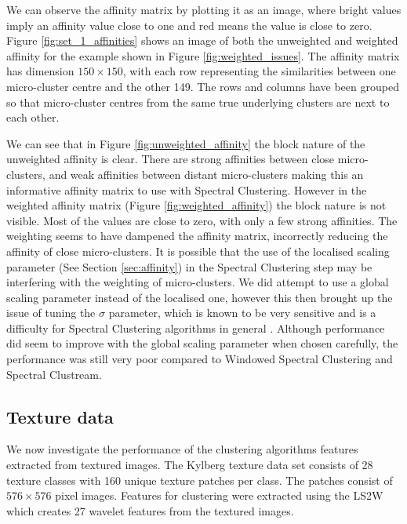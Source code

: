 We can observe the affinity matrix by plotting it as an image, where bright values imply an affinity value close to one and red means the value is close to zero. Figure \ref{fig:set_1_affinities} shows an image of both the unweighted and weighted affinity for the example shown in Figure \ref{fig:weighted_issues}. The affinity matrix has dimension $150 \times 150$, with each row representing the similarities between one micro-cluster centre and the other 149. The rows and columns have been grouped so that micro-cluster centres from the same true underlying clusters are next to each other. 

We can see that in Figure \ref{fig:unweighted_affinity} the block nature of the unweighted affinity is clear. There are strong affinities between close micro-clusters, and weak affinities between distant micro-clusters making this an informative affinity matrix to use with Spectral Clustering. However in the weighted affinity matrix (Figure \ref{fig:weighted_affinity}) the block nature is not visible. Most of the values are close to zero, with only a few strong affinities. The weighting seems to have dampened the affinity matrix, incorrectly reducing the affinity of  close micro-clusters. It is possible that the use of the localised scaling parameter (See Section \ref{sec:affinity}) in the Spectral Clustering step may be interfering with the weighting of micro-clusters.  We did attempt to use a global scaling parameter instead of the localised one, however this then brought up the issue of tuning the $\sigma$ parameter, which is known to be very sensitive and is a difficulty for Spectral Clustering algorithms in general \citep{Luxburg2008}. Although performance did seem to improve with the global scaling parameter when chosen carefully, the performance was still very poor compared to Windowed Spectral Clustering and Spectral Clustream.


\subsection{Texture data}

We now investigate the performance of the clustering algorithms features extracted from textured images. The Kylberg  texture data set \citep{kylberg2011c} consists of 28 texture classes with 160 unique texture patches per class. The patches consist of $576 \times 576$ pixel images. Features for clustering were extracted using the LS2W \citep{Eckley2011} which creates 27 wavelet features from the textured images. 

